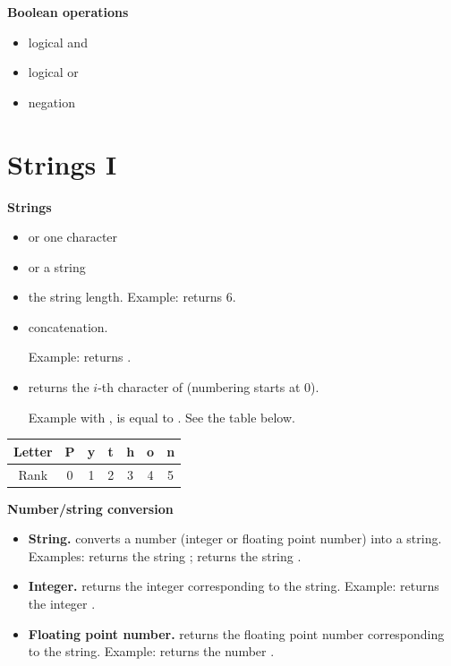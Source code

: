 \documentclass[11pt,class=report,crop=false]{standalone}
\begin{document}
\bigskip
  
\textbf{Boolean operations}
  \begin{itemize}
    \item {} \quad \quad logical \og{}and\fg{}
    	\item {} \quad logical \og{}or\fg{}
    	\item {} \quad negation
  \end{itemize} 
  
  
\section{Strings I}

\textbf{Strings}

\begin{itemize}
  \item {} \quad or \quad {} \quad one character
  \item {}\quad or \quad {} \quad a string
  \item {}\quad the string length. Example:  returns $6$.
  \item {}\quad concatenation.   
  
  Example:  returns .
  
  \item {}\quad returns the $i$-th character of  (numbering starts at $0$). 
  
  Example with ,  is equal to . See the table below.
\end{itemize}

\begin{center}
\begin{tabular}{|c||c|c|c|c|c|c|}
\hline
Letter & \textbf{P} & \textbf{y} & \textbf{t} & \textbf{h} & \textbf{o} & \textbf{n} \\ \hline
Rank & 0 & 1 & 2 & 3 & 4 & 5 \\ \hline
\end{tabular}
\end{center}


\textbf{Number/string conversion}

\begin{itemize}
  \item \textbf{String.} \quad converts a number (integer or floating point number) into a string.
  Examples:  returns the string ;  returns the string .
  
  \item \textbf{Integer.} \quad returns the integer corresponding to the string. Example:  returns the integer .
  
   \item \textbf{Floating point number.} \quad returns the floating point number corresponding to the string. Example:  returns the number . 
 \end{itemize}  
\end{document}
